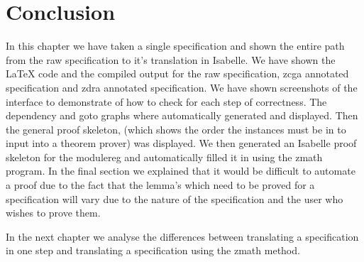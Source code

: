 






\section{Conclusion}
In this chapter we have taken a single specification and shown the entire path
from the raw specification to it's translation in Isabelle. We have shown the
\LaTeX{} code and the compiled output for the raw specification, \gls{zcga}
annotated specification and \gls{zdra} annotated specification. We have shown
screenshots of the interface to demonstrate of how to check for each step of
correctness. The dependency and goto graphs where automatically generated and
displayed. Then the general proof skeleton, (which shows the order the instances
must be in to input into a theorem prover) was displayed. We then generated an
Isabelle proof skeleton for the modulereg and automatically filled it in
using the \gls{zmath} program. In the final section we explained that it would
be difficult to automate a proof due to the fact that the lemma's which need to
be proved for a specification will vary due to the nature of the specification
and the user who wishes to prove them. 

In the next chapter we analyse the differences between translating a
specification in one step and translating a specification using the \gls{zmath}
method.